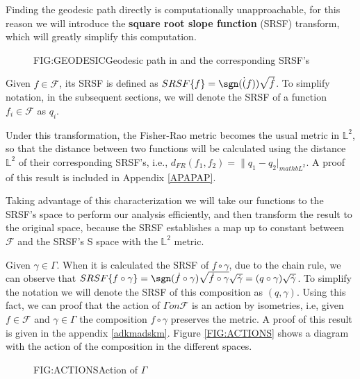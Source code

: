 Finding the geodesic path directly is computationally unapproachable,
for this reason we will introduce the \textbf{square root slope function} (SRSF)
transform, which will greatly simplify this computation.

\begin{figure}[Geodesic path in \mathcal{F}]{FIG:GEODESIC}{Geodesic path in  and the corresponding SRSF's}
   \quad
\end{figure}


Given $f \in \mathcal{F}$, its SRSF is defined as
$SRSF\{f\} = \sgn(\dot(f)) \sqrt{\dot f}$. To simplify notation, in the
subsequent sections, we will denote the SRSF of a function
$f_i \in \mathcal{F}$ as $q_i$.

Under this transformation, the Fisher-Rao metric becomes the usual metric
in $\mathbb{L}^2$, so that the distance between two functions will be
calculated using the distance $\mathbb{L}^2$ of their corresponding
SRSF's, i.e.,  $d_{FR}(f_1, f_2) = \| q_1 - q_2 |_{mathb{L}^2}$. A proof of
this result is included in Appendix \ref{APAPAP}.

Taking advantage of this characterization we will take our functions to the
SRSF's space to perform our analysis efficiently, and then transform the result
to the original space, because the SRSF establishes a map up to constant between
$\mathcal{F}$ and the SRSF's S space with the $\mathbb{L}^2$ metric.

Given $\gamma \in \Gamma$. When it is calculated the SRSF of $f \circ \gamma$,
due to the chain rule, we can observe that
$SRSF\{f \circ \gamma\} = \sgn(\dot{f} \circ \gamma) \sqrt{\dot f \circ \gamma}
\sqrt{\dot \gamma} = (q \circ \gamma) \sqrt{\dot \gamma}$. To simplify the
notation we  will denote the SRSF of this composition as $(q, \gamma)$.
Using this fact, we can proof that the action of $\Gamma on \mathscr{F}$ is an
action by isometries, i.e, given $f  \in \mathscr{F}$ and $\gamma \in \Gamma$
the composition $f \circ \gamma$ preserves the metric.
A proof of this result is given in the appendix \ref{adkmadskm}.
Figure \ref{FIG:ACTIONS} shows a diagram with the action of the composition
in the different spaces.

\begin{figure}[Action of $\Gamma$]{FIG:ACTIONS}{Action of $\Gamma$}


\end{figure}
